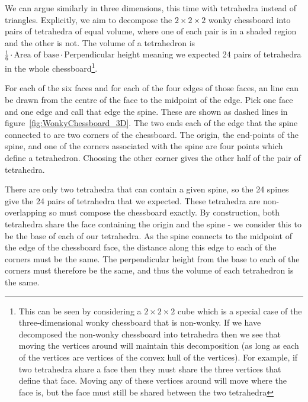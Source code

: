 \begin{parts}
\begin{solution}
\begin{minipage}{\linewidth}
			\label{fig:WonkyChessboard_EqualAreaTriangles}
		\end{minipage}
		
		We can argue similarly in three dimensions, this time with tetrahedra instead of triangles. Explicitly, we aim to decompose the $2 \times 2 \times 2$ wonky chessboard into pairs of tetrahedra of equal volume, where one of each pair is in a shaded region and the other is not. The volume of a tetrahedron is $\frac{1}{6} \cdot \text{Area of base} \cdot \text{Perpendicular height}$ meaning we expected 24 pairs of tetrahedra in the whole chessboard\footnote{This can be seen by considering a $2 \times 2 \times 2$ cube which is a special case of the three-dimensional wonky chessboard that is non-wonky. If we have decomposed the non-wonky chessboard into tetrahedra then we see that moving the vertices around will maintain this decomposition (as long as each of the vertices are vertices of the convex hull of the vertices). For example, if two tetrahedra share a face then they must share the three vertices that define that face. Moving any of these vertices around will move where the face is, but the face must still be shared between the two tetrahedra}.
		
		For each of the six faces and for each of the four edges of those faces, an line can be drawn from the centre of the face to the midpoint of the edge. Pick one face and one edge and call that edge the spine. These are shown as dashed lines in figure~\ref{fig:WonkyChessboard_3D}. The two ends each of the edge that the spine connected to are two corners of the chessboard. The origin, the end-points of the spine, and one of the corners associated with the spine are four points which define a tetrahedron. Choosing the other corner gives the other half of the pair of tetrahedra.
		
		There are only two tetrahedra that can contain a given spine, so the 24 spines give the 24 pairs of tetrahedra that we expected. These tetrahedra are non-overlapping so must compose the chessboard exactly. By construction, both tetrahedra share the face containing the origin and the spine - we consider this to be the base of each of our tetrahedra. As the spine connects to the midpoint of the edge of the chessboard face, the distance along this edge to each of the corners must be the same. The perpendicular height from the base to each of the corners must therefore be the same, and thus the volume of each tetrahedron is the same.
		

\end{solution}
\end{parts}

